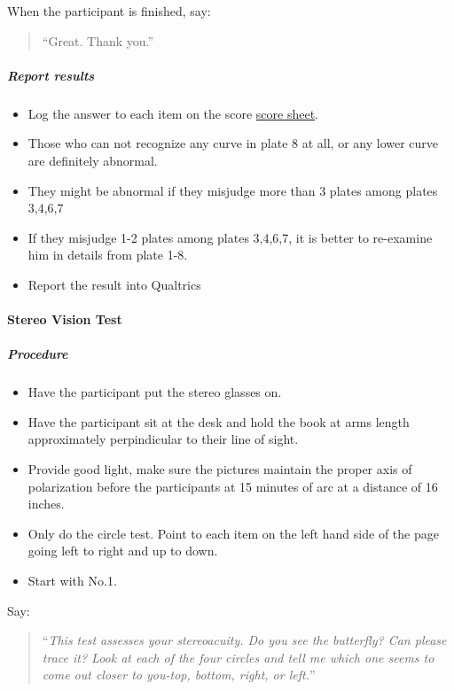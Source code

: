 \documentclass[]{article}
\providecommand{\tightlist}{%
  \setlength{\itemsep}{0pt}\setlength{\parskip}{0pt}}
\let\oldparagraph\paragraph
\renewcommand{\paragraph}[1]{\oldparagraph{#1}\mbox{}}
\let\oldsubparagraph\subparagraph
\renewcommand{\subparagraph}[1]{\oldsubparagraph{#1}\mbox{}}
\begin{document}
When the participant is finished, say:

\begin{quote}
``Great. Thank you.''
\end{quote}

\subparagraph{Report results}\label{report-results-1}

\begin{itemize}
\tightlist
\item
  Log the answer to each item on the score
  \href{vision-screening-score-sheet.html}{score sheet}.
\item
  Those who can not recognize any curve in plate 8 at all, or any lower
  curve are definitely abnormal.
\item
  They might be abnormal if they misjudge more than 3 plates among
  plates 3,4,6,7
\item
  If they misjudge 1-2 plates among plates 3,4,6,7, it is better to
  re-examine him in details from plate 1-8.
\item
  Report the result into Qualtrics
\end{itemize}

\paragraph{Stereo Vision Test}\label{stereo-vision-test}

\subparagraph{Procedure}\label{procedure-2}

\begin{itemize}
\tightlist
\item
  Have the participant put the stereo glasses on.
\item
  Have the participant sit at the desk and hold the book at arms length
  approximately perpindicular to their line of sight.
\item
  Provide good light, make sure the pictures maintain the proper axis of
  polarization before the participants at 15 minutes of arc at a
  distance of 16 inches.
\item
  Only do the circle test. Point to each item on the left hand side of
  the page going left to right and up to down.
\item
  Start with No.1.
\end{itemize}

Say:

\begin{quote}
``\emph{This test assesses your stereoacuity. Do you see the butterfly?
Can please trace it? Look at each of the four circles and tell me which
one seems to come out closer to you-top, bottom, right, or left.}''
\end{quote}
\end{document}
